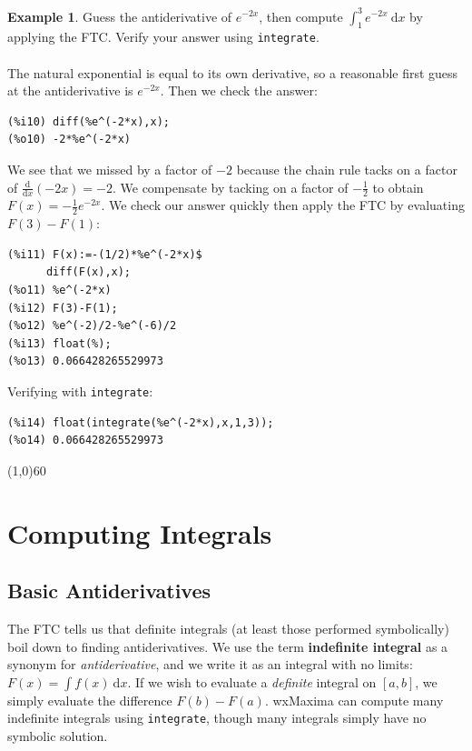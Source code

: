 \documentclass[10.5pt,twoside]{report}
\theoremstyle{definition}
\newtheorem{exmp}{Example}[section]
\begin{document}
\begin{exmp}  Guess the antiderivative of $e^{-2x}$, then compute $\displaystyle \int_1^3 e^{-2x} \ \mathrm{d}x$ by applying the FTC.  Verify your answer using \verb|integrate|.\\
${}$\\

The natural exponential is equal to its own derivative, so a reasonable first guess at the antiderivative is $e^{-2x}$.  Then we check the answer:

\begin{verbatim}
(%i10) diff(%e^(-2*x),x);
(%o10) -2*%e^(-2*x)
\end{verbatim}

We see that we missed by a factor of $-2$ because the chain rule tacks on a factor of $\frac{\mathrm{d}}{\mathrm{d}x}(-2x)=-2$.  We compensate by tacking on a factor of $-\frac{1}{2}$ to obtain $F(x)=-\frac{1}{2} e^{-2x}$.  We check our answer quickly then apply the FTC by evaluating $F(3)-F(1)$:

\begin{verbatim}
(%i11) F(x):=-(1/2)*%e^(-2*x)$
      diff(F(x),x);
(%o11) %e^(-2*x)
(%i12) F(3)-F(1);
(%o12) %e^(-2)/2-%e^(-6)/2
(%i13) float(%);
(%o13) 0.066428265529973
\end{verbatim}

Verifying with \verb|integrate|:

\begin{verbatim}
(%i14) float(integrate(%e^(-2*x),x,1,3));
(%o14) 0.066428265529973
\end{verbatim}

\end{exmp}

\line(1,0){60}
\linethickness{0.5mm}

\pagebreak

\section{Computing Integrals}\label{Computing Integrals}

\subsection{Basic Antiderivatives}

The FTC tells us that definite integrals (at least those performed symbolically) boil down to finding antiderivatives.  We use the term \textbf{indefinite integral} as a synonym for \textit{antiderivative}, and we write it as an integral with no limits:  $F(x)=\displaystyle \int f(x) \ \mathrm{d}x$.  If we wish to evaluate a \textit{definite} integral on $[a,b]$, we simply evaluate the difference $F(b)-F(a)$.  wxMaxima can compute many indefinite integrals using \verb|integrate|, though many integrals simply have no symbolic solution.
\end{document}
